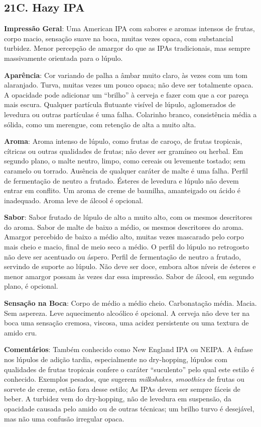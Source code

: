 \subsection*{21C. Hazy IPA}

\textbf{Impressão Geral}: Uma American IPA com sabores e aromas intensos de frutas, corpo macio, sensação suave na boca, muitas vezes opaca, com substancial turbidez. Menor percepção de amargor do que as IPAs tradicionais, mas sempre massivamente orientada para o lúpulo.

\textbf{Aparência}: Cor variando de palha a âmbar muito claro, às vezes com um tom alaranjado. Turva, muitas vezes um pouco opaca; não deve ser totalmente opaca. A opacidade pode adicionar um “brilho” à cerveja e fazer com que a cor pareça mais escura. Qualquer partícula flutuante visível de lúpulo, aglomerados de levedura ou outras partículas é uma falha. Colarinho branco, consistência média a sólida, como um merengue, com retenção de alta a muito alta.

\textbf{Aroma}: Aroma intenso de lúpulo, como frutas de caroço, de frutas tropicais, cítricas ou outras qualidades de frutas; não dever ser gramíneo ou herbal. Em segundo plano, o malte neutro, limpo, como cereais ou levemente tostado; sem caramelo ou torrado. Ausência de qualquer caráter de malte é uma falha. Perfil de fermentação de neutro a frutado. Ésteres de levedura e lúpulo não devem entrar em conflito. Um aroma de creme de baunilha, amanteigado ou ácido é inadequado. Aroma leve de álcool é opcional.

\textbf{Sabor}: Sabor frutado de lúpulo de alto a muito alto, com os mesmos descritores do aroma. Sabor de malte de baixo a médio, os mesmos descritores do aroma. Amargor percebido de baixo a médio alto, muitas vezes mascarado pelo corpo mais cheio e macio, final de meio seco a médio. O perfil do lúpulo no retrogosto não deve ser acentuado ou áspero. Perfil de fermentação de neutro a frutado, servindo de suporte ao lúpulo. Não deve ser doce, embora altos níveis de ésteres e menor amargor possam às vezes dar essa impressão. Sabor de álcool, em segundo plano, é opcional.

\textbf{Sensação na Boca}: Corpo de médio a médio cheio. Carbonatação média. Macia. Sem aspereza. Leve aquecimento alcoólico é opcional. A cerveja não deve ter na boca uma sensação cremosa, viscosa, uma acidez persistente ou uma textura de amido cru.

\textbf{Comentários}: Também conhecido como New England IPA ou NEIPA. A ênfase nos lúpulos de adição tardia, especialmente no dry-hopping, lúpulos com qualidades de frutas tropicais confere o caráter “suculento” pelo qual este estilo é conhecido. Exemplos pesados, que sugerem \textit{milkshakes}, \textit{smoothies} de frutas ou sorvete de creme, estão fora desse estilo; As IPAs devem ser sempre fáceis de beber. A turbidez vem do dry-hopping, não de levedura em suspensão, da opacidade causada pelo amido ou de outras técnicas; um brilho turvo é desejável, mas não uma confusão irregular opaca.

